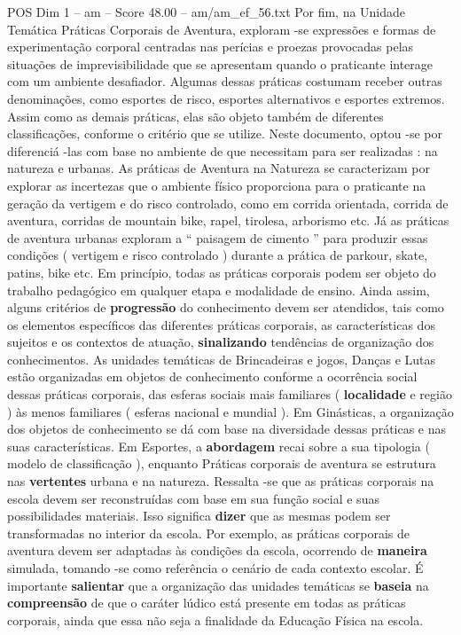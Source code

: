 \begin{textsample}{POS Dim 1 – am – Score 48.00 – am/am\_ef\_56.txt}
Por fim, na Unidade Temática Práticas Corporais de Aventura, exploram -se expressões e formas de experimentação corporal centradas nas perícias e proezas provocadas pelas situações de imprevisibilidade que se apresentam quando o praticante interage com um ambiente desafiador.
Algumas dessas práticas costumam receber outras denominações, como esportes de risco, esportes alternativos e esportes extremos.
Assim como as demais práticas, elas são objeto também de diferentes classificações, conforme o critério que se utilize.
Neste documento, optou -se por diferenciá -las com base no ambiente de que necessitam para ser realizadas : na natureza e urbanas.
As práticas de Aventura na Natureza se caracterizam por explorar as incertezas que o ambiente físico proporciona para o praticante na geração da vertigem e do risco controlado, como em corrida orientada, corrida de aventura, corridas de mountain bike, rapel, tirolesa, arborismo etc.
Já as práticas de aventura urbanas exploram a “ paisagem de cimento ” para produzir essas condições ( vertigem e risco controlado ) durante a prática de parkour, skate, patins, bike etc.
Em princípio, todas as práticas corporais podem ser objeto do trabalho pedagógico em qualquer etapa e modalidade de ensino.
Ainda assim, alguns critérios de \textbf{progressão} do conhecimento devem ser atendidos, tais como os elementos específicos das diferentes práticas corporais, as características dos sujeitos e os contextos de atuação, \textbf{sinalizando} tendências de organização dos conhecimentos.
As unidades temáticas de Brincadeiras e jogos, Danças e Lutas estão organizadas em objetos de conhecimento conforme a ocorrência social dessas práticas corporais, das esferas sociais mais familiares ( \textbf{localidade} e região ) às menos familiares ( esferas nacional e mundial ).
Em Ginásticas, a organização dos objetos de conhecimento se dá com base na diversidade dessas práticas e nas suas características.
Em Esportes, a \textbf{abordagem} recai sobre a sua tipologia ( modelo de classificação ), enquanto Práticas corporais de aventura se estrutura nas \textbf{vertentes} urbana e na natureza.
Ressalta -se que as práticas corporais na escola devem ser reconstruídas com base em sua função social e suas possibilidades materiais.
Isso significa \textbf{dizer} que as mesmas podem ser transformadas no interior da escola.
Por exemplo, as práticas corporais de aventura devem ser adaptadas às condições da escola, ocorrendo de \textbf{maneira} simulada, tomando -se como referência o cenário de cada contexto escolar.
É importante \textbf{salientar} que a organização das unidades temáticas se \textbf{baseia} na \textbf{compreensão} de que o caráter lúdico está presente em todas as práticas corporais, ainda que essa não seja a finalidade da Educação Física na escola.

\end{textsample}
